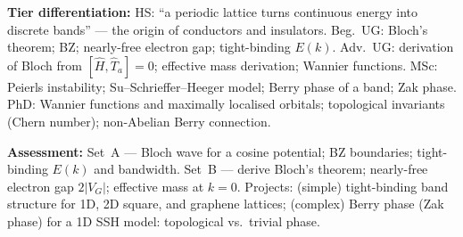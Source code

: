 \documentclass[11pt,a4paper]{article}
\begin{document}
\begin{tcolorbox}[modulebox, title={Module~I.4 / L02: The Simple Bloch Electron}]
\medskip\textbf{Tier differentiation:}
HS: ``a periodic lattice turns continuous energy into discrete bands'' --- the origin of conductors and insulators.
Beg.\ UG: Bloch's theorem; BZ; nearly-free electron gap; tight-binding $E(k)$.
Adv.\ UG: derivation of Bloch from $[\hat{H},\hat{T}_a]=0$; effective mass derivation; Wannier functions.
MSc: Peierls instability; Su--Schrieffer--Heeger model; Berry phase of a band; Zak phase.
PhD: Wannier functions and maximally localised orbitals; topological invariants (Chern number); non-Abelian Berry connection.

\medskip\textbf{Assessment:}
Set~A --- Bloch wave for a cosine potential; BZ boundaries; tight-binding $E(k)$ and bandwidth.
Set~B --- derive Bloch's theorem; nearly-free electron gap $2|V_G|$; effective mass at $k=0$.
Projects: (simple) tight-binding band structure for 1D, 2D square, and graphene lattices;
(complex) Berry phase (Zak phase) for a 1D SSH model: topological vs.\ trivial phase.
\end{tcolorbox}

\medskip
\end{document}
